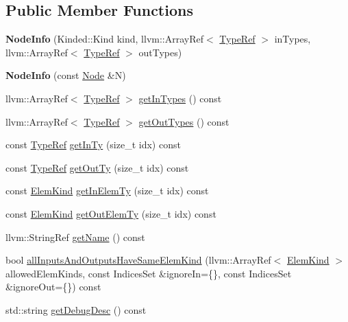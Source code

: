 \subsection*{Public Member Functions}
\begin{DoxyCompactItemize}
\item 
\mbox{\label{classglow_1_1_node_info_a0712e3479ddd6adf44e530a622364d3a}} 
{\bfseries Node\+Info} (Kinded\+::\+Kind kind, llvm\+::\+Array\+Ref$<$ \hyperlink{structglow_1_1_type}{Type\+Ref} $>$ in\+Types, llvm\+::\+Array\+Ref$<$ \hyperlink{structglow_1_1_type}{Type\+Ref} $>$ out\+Types)
\item 
\mbox{\label{classglow_1_1_node_info_a1ecda7dc2bd683a011239c7abe755cf5}} 
{\bfseries Node\+Info} (const \hyperlink{classglow_1_1_node}{Node} \&N)
\item 
llvm\+::\+Array\+Ref$<$ \hyperlink{structglow_1_1_type}{Type\+Ref} $>$ \hyperlink{classglow_1_1_node_info_aec9acac75fd1d5cf16ad3337392902c3}{get\+In\+Types} () const
\item 
llvm\+::\+Array\+Ref$<$ \hyperlink{structglow_1_1_type}{Type\+Ref} $>$ \hyperlink{classglow_1_1_node_info_a0054dece1b1c57116ddb4fe7d5749cc7}{get\+Out\+Types} () const
\item 
const \hyperlink{structglow_1_1_type}{Type\+Ref} \hyperlink{classglow_1_1_node_info_a8f1cb453edfdfd694c8e345a5ba53d23}{get\+In\+Ty} (size\+\_\+t idx) const
\item 
const \hyperlink{structglow_1_1_type}{Type\+Ref} \hyperlink{classglow_1_1_node_info_a3a315e1307eb6c1114174e98f60d7232}{get\+Out\+Ty} (size\+\_\+t idx) const
\item 
const \hyperlink{namespaceglow_ab92e14a94329daf4083db670e95fbcdf}{Elem\+Kind} \hyperlink{classglow_1_1_node_info_acf9bbfa62aa8ae0f0bc716c7054bdb52}{get\+In\+Elem\+Ty} (size\+\_\+t idx) const
\item 
const \hyperlink{namespaceglow_ab92e14a94329daf4083db670e95fbcdf}{Elem\+Kind} \hyperlink{classglow_1_1_node_info_abcd1099dede4ba394348542891e32a30}{get\+Out\+Elem\+Ty} (size\+\_\+t idx) const
\item 
llvm\+::\+String\+Ref \hyperlink{classglow_1_1_node_info_a0c55e6a0f96c6afd990d4d545d8e9000}{get\+Name} () const
\item 
bool \hyperlink{classglow_1_1_node_info_aea1836c8e7b145dff07b80342485a5ff}{all\+Inputs\+And\+Outputs\+Have\+Same\+Elem\+Kind} (llvm\+::\+Array\+Ref$<$ \hyperlink{namespaceglow_ab92e14a94329daf4083db670e95fbcdf}{Elem\+Kind} $>$ allowed\+Elem\+Kinds, const Indices\+Set \&ignore\+In=\{\}, const Indices\+Set \&ignore\+Out=\{\}) const
\item 
std\+::string \hyperlink{classglow_1_1_node_info_ad3444cb445c3a8d9e8bbbd4601f989e7}{get\+Debug\+Desc} () const
\end{DoxyCompactItemize}

